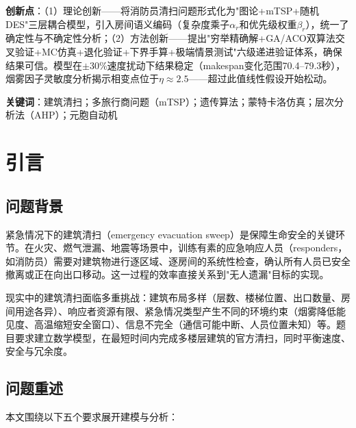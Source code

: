 \documentclass[12pt,a4paper]{ctexart}
\begin{document}
\textbf{创新点}：（1）理论创新——将消防员清扫问题形式化为"图论+mTSP+随机DES"三层耦合模型，引入房间语义编码（复杂度乘子$\alpha_r$和优先级权重$\beta_r$），统一了确定性与不确定性分析；（2）方法创新——提出"穷举精确解+GA/ACO双算法交叉验证+MC仿真+退化验证+下界手算+极端情景测试"六级递进验证体系，确保结果可信。模型在$\pm$30\%速度扰动下结果稳定（makespan变化范围70.4--79.3秒），烟雾因子灵敏度分析揭示相变点位于$\eta\approx 2.5$——超过此值线性假设开始松动。

\textbf{关键词}：建筑清扫；多旅行商问题（mTSP）；遗传算法；蒙特卡洛仿真；层次分析法（AHP）；元胞自动机

\newpage

\tableofcontents
\newpage

\section{引言}

\subsection{问题背景}

紧急情况下的建筑清扫（emergency evacuation sweep）是保障生命安全的关键环节。在火灾、燃气泄漏、地震等场景中，训练有素的应急响应人员（responders，如消防员）需要对建筑物进行逐区域、逐房间的系统性检查，确认所有人员已安全撤离或正在向出口移动。这一过程的效率直接关系到"无人遗漏"目标的实现。

现实中的建筑清扫面临多重挑战：建筑布局多样（层数、楼梯位置、出口数量、房间用途各异）、响应者资源有限、紧急情况类型产生不同的环境约束（烟雾降低能见度、高温缩短安全窗口）、信息不完全（通信可能中断、人员位置未知）等。题目要求建立数学模型，在最短时间内完成多楼层建筑的官方清扫，同时平衡速度、安全与冗余度。

\subsection{问题重述}

本文围绕以下五个要求展开建模与分析：
\end{document}
